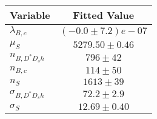 \begin{tabular}[t]{lc}
\hline
Variable &Fitted Value\\
\hline\hline
$\lambda_{B,c}$&$(-0.0\pm7.2)e-07$\\
\hline
$\mu_S$&$5279.50\pm0.46$\\
\hline
$n_{B, D^* D_s h}$&$796\pm42$\\
\hline
$n_{B,c}$&$114\pm50$\\
\hline
$n_S$&$1613\pm39$\\
\hline
$\sigma_{B, D^* D_s h}$&$72.2\pm2.9$\\
\hline
$\sigma_S$&$12.69\pm0.40$\\
\hline
\end{tabular}